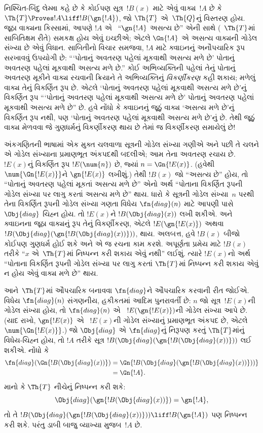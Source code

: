 \begin{explain}
નિશ્ચિત-બિંદુ લેમ્મા કહે છે કે
કોઈપણ સૂત્ર~$!B(x)$ માટે
એવું વાક્ય~$!A$ છે કે
$\Th{T} \Proves !A \liff !B(\gn{!A})$,
જો $\Th{T}$ એ~$\Th{Q}$નું
વિસ્તરણ હોય. જૂઠા વાક્યના
કિસ્સામાં, આપણે $!A$ એ
~``$\gn{!A}$ અસત્ય છે''
એની સાથે (~$\Th{T}$માં
સાબિતિક્ષમ રીતે) સમકક્ષ
હોય એવું ઇચ્છીએ; એટલે
$\Gn{!A}$ એ અસત્ય
વાક્યની ગોડેલ સંખ્યા
છે એવું વિધાન.
સાબિતીનો વિચાર સમજવા,
$!A$ માટે ક્વાઇનનું
અનૌપચારિક રૂપ સરખાવવું
ઉપયોગી છે: ``{}`પોતાનું
અવતરણ પહેલાં મૂકવાથી
અસત્ય મળે છે' પોતાનું
અવતરણ પહેલાં મૂકવાથી
અસત્ય મળે છે.'' કોઈ
અભિવ્યક્તિની પહેલાં તેનું
પોતાનું અવતરણ મૂકીને
વાક્ય રચવાની ક્રિયાને તે
અભિવ્યક્તિનું
\emph{વિકર્ણીકરણ} કહી શકાય;
મળેલું વાક્ય તેનું
વિકર્ણિત રૂપ છે.
એટલે `પોતાનું અવતરણ
પહેલાં મૂકવાથી અસત્ય મળે
છે'નું વિકર્ણિત રૂપ
``{}`પોતાનું અવતરણ પહેલાં
મૂકવાથી અસત્ય મળે છે'
પોતાનું અવતરણ પહેલાં
મૂકવાથી અસત્ય મળે છે'' છે.
હવે નોંધો કે ક્વાઇનનું
જૂઠું વાક્ય `અસત્ય મળે છે'નું
વિકર્ણિત રૂપ નથી, પણ
`પોતાનું અવતરણ પહેલાં
મૂકવાથી અસત્ય મળે છે'નું
છે. તેથી જૂઠું વાક્ય
મેળવવા જે ગુણધર્મનું
વિકર્ણીકરણ થાય છે તેમાં
જ વિકર્ણીકરણ સમાયેલું છે!{}

અંકગણિતની ભાષામાં એક
મુક્ત ચલવાળા સૂત્રની
ગોડેલ સંખ્યા ગણીએ અને
પછી તે ચલને એ ગોડેલ
સંખ્યાના પ્રમાણભૂત અંકપદથી
બદલીએ; આમ તેના અવતરણ
રચાય છે.
~$!E(x)$નું વિકર્ણિત
રૂપ $!E(\num{n})$ છે,
જ્યાં $n = \Gn{!E(x)}$.
(હવેથી $\num{\Gn{!E(x)}}$ને
$\gn{!E(x)}$ લખીશું.)
તેથી $!B(x)$ જો
``અસત્ય છે'' હોય,
તો ``પોતાનું અવતરણ પહેલાં
મૂકતાં અસત્ય મળે છે''
એનો અર્થ ``પોતાના
વિકર્ણિત રૂપની ગોડેલ
સંખ્યા પર લાગુ કરતાં
અસત્ય મળે છે'' થાય.
ધારો કે સૂત્રની
ગોડેલ સંખ્યા~$n$ પરથી
તેના વિકર્ણિત રૂપની
ગોડેલ સંખ્યા ગણતા વિધેય
$\fn{diag}(n)$ માટે
આપણી પાસે
~$\Obj{diag}$ ચિહ્ન હોય.
તો $!E(x)$ને
$!B(\Obj{diag}(x))$
લખી શકીએ. અને ક્વાઇનના
જૂઠા વાક્યનું રૂપ તેનું
વિકર્ણીકરણ, એટલે
$!E(\gn{!E(x)})$ અથવા
$!B(\Obj{diag}(\gn{!B(\Obj{diag}(x))}))$,
થાય. અલબત્ત, હવે
$!B(x)$ બીજો કોઈપણ
ગુણધર્મ હોઈ શકે અને એ
જ રચના કામ કરશે.
અપૂર્ણતા પ્રમેય માટે
$!B(x)$ તરીકે
``$x$ એ~$\Th{T}$માં
નિષ્પન્ન કરી શકાય એવું નથી'' લઈશું.
ત્યારે $!E(x)$નો અર્થ
``પોતાના વિકર્ણિત રૂપની
ગોડેલ સંખ્યા પર લાગુ
કરતાં $\Th{T}$માં
નિષ્પન્ન કરી શકાય એવું ન હોય એવું
વાક્ય મળે છે''
થાય.

આને~$\Th{T}$માં ઔપચારિક
બનાવવા $\fn{diag}$ને
ઔપચારિક કરવાની રીત
જોઈએ. વિધેય
$\fn{diag}(n)$ સંગણનીય,
હકીકતમાં આદિમ પુનરાવર્તી
છે: $n$ જો
સૂત્ર~$!E(x)$ની ગોડેલ
સંખ્યા હોય, તો
$\fn{diag}(n)$ એ
~$!E(\gn{!E(x)})$ની
ગોડેલ સંખ્યા આપે છે.
(યાદ રાખો,
$\gn{!E(x)}$ એ
~$!E(x)$ની ગોડેલ સંખ્યાનું
પ્રમાણભૂત અંકપદ છે,
એટલે $\num{\Gn{!E(x)}}$.)
જો $\Obj{diag}$ એ
$\fn{diag}$નું નિરૂપણ
કરતું $\Th{T}$માંનું
વિધેય-ચિહ્ન હોય,
તો $!A$ તરીકે સૂત્ર
$!B(\Obj{diag}(\gn{!B(\Obj{diag}(x))}))$
લઈ શકીએ. નોંધો કે
\begin{align*}
\fn{diag}(\Gn{!B(\Obj{diag}(x))}) & =
\Gn{!B(\Obj{diag}(\gn{!B(\Obj{diag}(x))}))} \\
& = \Gn{!A}.
\end{align*}
માનો કે $\Th{T}$ નીચેનું
નિષ્પન્ન કરી શકે:
\[
\Obj{diag}(\gn{!B(\Obj{diag}(x))}) = \gn{!A},
\]
તો તે
$!B(\Obj{diag}(\gn{!B(\Obj{diag}(x))}))
\liff !B(\gn{!A})$
પણ નિષ્પન્ન કરી શકે.
પરંતુ ડાબી બાજુ
વ્યાખ્યા મુજબ~$!A$ છે.


\end{explain}
